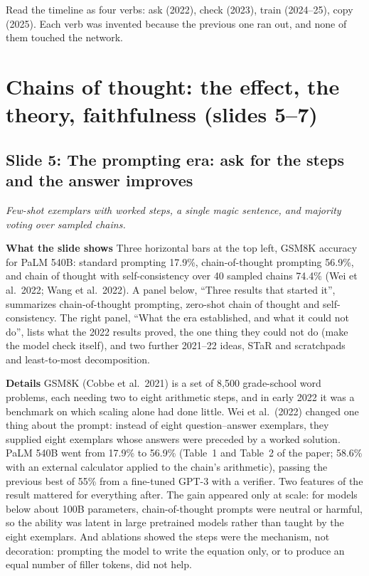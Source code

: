 \documentclass[11pt,letterpaper]{article}
\newcommand{\setstage}[1]{\colorlet{stagec}{#1}}
\newcommand{\slide}[3]{%
  \subsection[Slide #1: #2]{Slide #1: #2}%
  {\color{muted}\itshape #3\par}\medskip}
\newcommand{\para}[1]{\medskip\noindent\textbf{#1}\quad}
\newenvironment{intuition}{\begin{tcolorbox}[intuitionbox]}{\end{tcolorbox}}
\begin{document}
\begin{intuition}
Read the timeline as four verbs: ask (2022), check (2023), train (2024--25), copy (2025). Each verb was invented because the previous one ran out, and none of them touched the network.
\end{intuition}
\setstage{tok}
\section{Chains of thought: the effect, the theory, faithfulness (slides 5--7)}

\slide{5}{The prompting era: ask for the steps and the answer improves}{Few-shot exemplars with worked steps, a single magic sentence, and majority voting over sampled chains.}

\para{What the slide shows} Three horizontal bars at the top left, GSM8K accuracy for PaLM 540B: standard prompting 17.9\%, chain-of-thought prompting 56.9\%, and chain of thought with self-consistency over 40 sampled chains 74.4\% (Wei et al.\ 2022; Wang et al.\ 2022). A panel below, ``Three results that started it'', summarizes chain-of-thought prompting, zero-shot chain of thought and self-consistency. The right panel, ``What the era established, and what it could not do'', lists what the 2022 results proved, the one thing they could not do (make the model check itself), and two further 2021--22 ideas, STaR and scratchpads and least-to-most decomposition.

\para{Details} GSM8K (Cobbe et al.\ 2021) is a set of 8,500 grade-school word problems, each needing two to eight arithmetic steps, and in early 2022 it was a benchmark on which scaling alone had done little. Wei et al.\ (2022) changed one thing about the prompt: instead of eight question--answer exemplars, they supplied eight exemplars whose answers were preceded by a worked solution. PaLM 540B went from 17.9\% to 56.9\% (Table~1 and Table~2 of the paper; 58.6\% with an external calculator applied to the chain's arithmetic), passing the previous best of 55\% from a fine-tuned GPT-3 with a verifier. Two features of the result mattered for everything after. The gain appeared only at scale: for models below about 100B parameters, chain-of-thought prompts were neutral or harmful, so the ability was latent in large pretrained models rather than taught by the eight exemplars. And ablations showed the steps were the mechanism, not decoration: prompting the model to write the equation only, or to produce an equal number of filler tokens, did not help.
\end{document}
